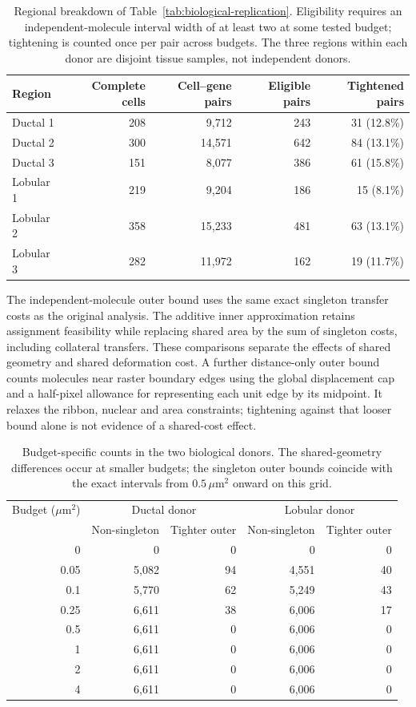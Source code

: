 \begin{table}[ht]\centering
\begin{tabular}{lrrrr}\toprule
Region&Complete cells&Cell--gene pairs&Eligible pairs&Tightened pairs\\\midrule
Ductal 1&208&9,712&243&31 (12.8\%)\\
Ductal 2&300&14,571&642&84 (13.1\%)\\
Ductal 3&151&8,077&386&61 (15.8\%)\\
Lobular 1&219&9,204&186&15 (8.1\%)\\
Lobular 2&358&15,233&481&63 (13.1\%)\\
Lobular 3&282&11,972&162&19 (11.7\%)\\\bottomrule
\end{tabular}
\caption{Regional breakdown of Table~\ref{tab:biological-replication}. Eligibility requires an independent-molecule interval width of at least two at some tested budget; tightening is counted once per pair across budgets. The three regions within each donor are disjoint tissue samples, not independent donors.}\label{tab:donor-regions}
\end{table}

The independent-molecule outer bound uses the same exact singleton transfer costs as the original analysis. The additive inner approximation retains assignment feasibility while replacing shared area by the sum of singleton costs, including collateral transfers. These comparisons separate the effects of shared geometry and shared deformation cost. A further distance-only outer bound counts molecules near raster boundary edges using the global displacement cap and a half-pixel allowance for representing each unit edge by its midpoint. It relaxes the ribbon, nuclear and area constraints; tightening against that looser bound alone is not evidence of a shared-cost effect.

\begin{table}[ht]\centering
\begin{tabular}{rrrrr}\toprule
Budget ($\mu\mathrm m^2$)&\multicolumn{2}{c}{Ductal donor}&\multicolumn{2}{c}{Lobular donor}\\
&Non-singleton&Tighter outer&Non-singleton&Tighter outer\\\midrule
0&0&0&0&0\\
0.05&5,082&94&4,551&40\\
0.1&5,770&62&5,249&43\\
0.25&6,611&38&6,006&17\\
0.5&6,611&0&6,006&0\\
1&6,611&0&6,006&0\\
2&6,611&0&6,006&0\\
4&6,611&0&6,006&0\\\bottomrule
\end{tabular}
\caption{Budget-specific counts in the two biological donors. The shared-geometry differences occur at smaller budgets; the singleton outer bounds coincide with the exact intervals from $0.5\,\mu\mathrm m^2$ onward on this grid.}
\end{table}

